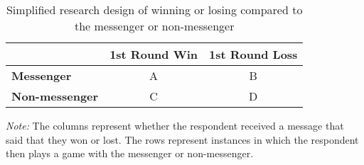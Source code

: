 \begin{table}[]
\centering
\caption{Simplified research design of winning or losing compared to the messenger or non-messenger}
\label{tab:research-design}
\begin{threeparttable}
\begin{tabular}{@{}lcc@{}}
\toprule
\textbf{} & \multicolumn{1}{l}{\textbf{1st Round Win}} & \multicolumn{1}{l}{\textbf{1st Round Loss}} \\ \midrule
\textbf{Messenger} & A & B \\
\textbf{Non-messenger} & C & D \\ \bottomrule
\end{tabular}%
\begin{tablenotes}[flushleft]
\scriptsize{\item[\hspace{-5mm}] \textit{Note:} The columns represent whether the respondent received a message that said that they won or lost. The rows represent instances in which the respondent then plays a game with the messenger or non-messenger.}
\end{tablenotes}
\end{threeparttable}
\end{table}